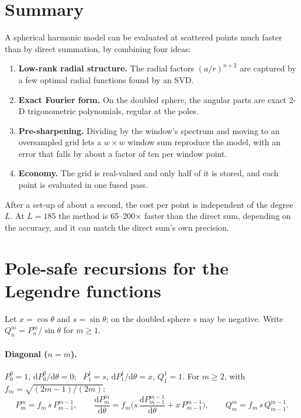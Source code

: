 \documentclass[11pt,a4paper]{article}
\theoremstyle{definition}
\newcommand{\dd}{\mathrm{d}}
\begin{document}
\section{Summary}
A spherical harmonic model can be evaluated at scattered points much faster than by direct summation, by combining four ideas:
\begin{enumerate}
\item \textbf{Low-rank radial structure.} The radial factors $(a/r)^{n+2}$ are captured by a few optimal radial functions found by an SVD.
\item \textbf{Exact Fourier form.} On the doubled sphere, the angular parts are exact 2-D trigonometric polynomials, regular at the poles.
\item \textbf{Pre-sharpening.} Dividing by the window's spectrum and moving to an oversampled grid lets a $w\times w$ window sum reproduce the model, with an error that falls
  by about a factor of ten per window point.
\item \textbf{Economy.} The grid is real-valued and only half of it is stored, and each point is evaluated in one fused pass.
\end{enumerate}
After a set-up of about a second, the cost per point is independent of the degree $L$. At $L=185$ the method is 65--200$\times$ faster than the direct sum,
depending on the accuracy, and it can match the direct sum's own precision.

\appendix
\section{Pole-safe recursions for the Legendre functions}\label{app:recursions}
Let $x=\cos\theta$ and $s=\sin\theta$; on the doubled sphere $s$ may be negative. Write $Q_n^m=P_n^m/\sin\theta$ for $m\ge1$.

\paragraph{Diagonal ($n=m$).} $P_0^0=1$, $\dd P_0^0/\dd\theta=0$; \ $P_1^1=s$, $\dd P_1^1/\dd\theta=x$, $Q_1^1=1$. For $m\ge2$, with $f_m=\sqrt{(2m-1)/(2m)}$:
\[
P_m^m=f_m\,s\,P_{m-1}^{m-1},\qquad \frac{\dd P_m^m}{\dd\theta}=f_m\Big(s\,\frac{\dd P_{m-1}^{m-1}}{\dd\theta}+x\,P_{m-1}^{m-1}\Big),\qquad Q_m^m=f_m\,s\,Q_{m-1}^{m-1}.
\]
\end{document}
